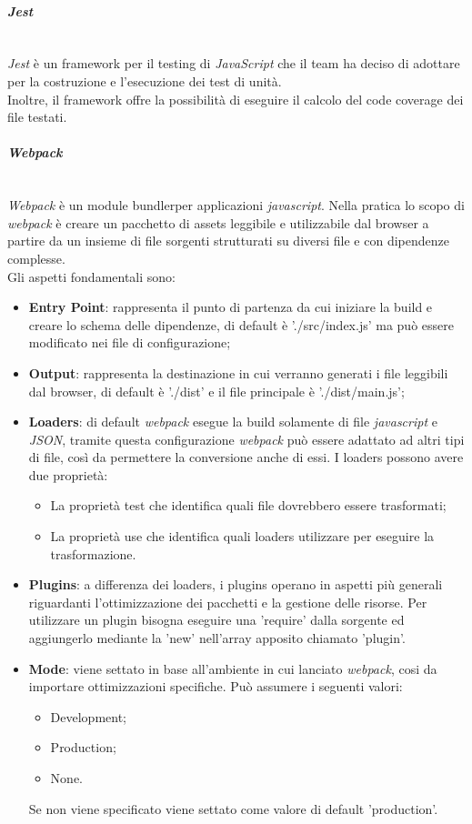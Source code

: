 \paragraph{\textit{Jest}}\-\\
\label{jest}
\textit{Jest} è un framework per il testing di \textit{JavaScript} che il team ha deciso di adottare per la costruzione e l'esecuzione dei test di unità.\\
Inoltre, il framework offre la possibilità di eseguire il calcolo del code coverage dei file testati.

\paragraph{\textit{Webpack}} \label{webpack}\-\\
\textit{Webpack} è un module bundler\glossario per applicazioni \textit{javascript}. Nella pratica lo scopo di \textit{webpack} è creare un pacchetto di assets leggibile e utilizzabile dal browser a partire da un insieme di file sorgenti strutturati su diversi file e con dipendenze complesse. \\
Gli aspetti fondamentali sono:
\begin{itemize}
\item \textbf{Entry Point}: rappresenta il punto di partenza da cui iniziare la build e creare lo schema delle dipendenze, di default è './src/index.js' ma può essere modificato nei file di configurazione;
\item \textbf{Output}: rappresenta la destinazione in cui verranno generati i file leggibili dal browser, di default è './dist' e il file principale è './dist/main.js';
\item \textbf{Loaders}: di default \textit{webpack} esegue la build solamente di file \textit{javascript} e \textit{JSON}\glossario, tramite questa configurazione \textit{webpack} può essere adattato ad altri tipi di file, così da permettere la conversione anche di essi. I loaders possono avere due proprietà: 
	\begin{itemize}
	\item La proprietà test che identifica quali file dovrebbero essere trasformati;
	\item La proprietà use che identifica quali loaders utilizzare per eseguire la trasformazione.
	\end{itemize}
\item \textbf{Plugins}: a differenza dei loaders, i plugins operano in aspetti più generali riguardanti l'ottimizzazione dei pacchetti e la gestione delle risorse. Per utilizzare un plugin bisogna eseguire una 'require' dalla sorgente ed aggiungerlo mediante la 'new' nell'array apposito chiamato 'plugin'.
\item \textbf{Mode}: viene settato in base all'ambiente in cui lanciato \textit{webpack}, cosi da importare ottimizzazioni specifiche. Può assumere i seguenti valori:
	\begin{itemize}
	\item Development;
	\item Production;
	\item None.
	\end{itemize}
Se non viene specificato viene settato come valore di default 'production'.
\end{itemize}